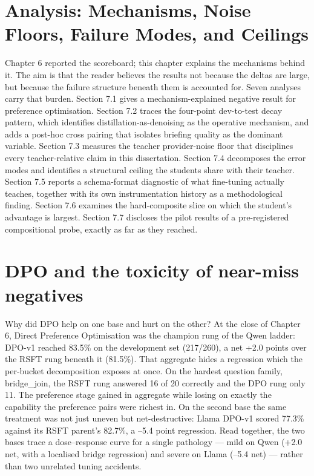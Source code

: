 \documentclass[10pt]{article} %
\begin{document}
\section{Analysis: Mechanisms, Noise Floors, Failure Modes, and Ceilings}\label{sec:chapter-7-analysis-mechanisms-noise-floo}

Chapter 6 reported the scoreboard; this chapter explains the mechanisms behind it. The aim is that the reader believes the results not because the deltas are large, but because the failure structure beneath them is accounted for. Seven analyses carry that burden. Section 7.1 gives a mechanism-explained negative result for preference optimisation. Section 7.2 traces the four-point dev-to-test decay pattern, which identifies distillation-as-denoising as the operative mechanism, and adds a post-hoc cross pairing that isolates briefing quality as the dominant variable. Section 7.3 measures the teacher provider-noise floor that disciplines every teacher-relative claim in this dissertation. Section 7.4 decomposes the error modes and identifies a structural ceiling the students share with their teacher. Section 7.5 reports a schema-format diagnostic of what fine-tuning actually teaches, together with its own instrumentation history as a methodological finding. Section 7.6 examines the hard-composite slice on which the student's advantage is largest. Section 7.7 discloses the pilot results of a pre-registered compositional probe, exactly as far as they reached.

\section{DPO and the toxicity of near-miss negatives}\label{sec:dpo-and-the-toxicity-of-near-miss-negati}

Why did DPO help on one base and hurt on the other? At the close of Chapter 6, Direct Preference Optimisation was the champion rung of the Qwen ladder: DPO-v1 reached 83.5\% on the development set (217/260), a net +2.0 points over the RSFT rung beneath it (81.5\%). That aggregate hides a regression which the per-bucket decomposition exposes at once. On the hardest question family, bridge\_join, the RSFT rung answered 16 of 20 correctly and the DPO rung only 11. The preference stage gained in aggregate while losing on exactly the capability the preference pairs were richest in. On the second base the same treatment was not just uneven but net-destructive: Llama DPO-v1 scored 77.3\% against its RSFT parent's 82.7\%, a --5.4 point regression. Read together, the two bases trace a dose--response curve for a single pathology --- mild on Qwen (+2.0 net, with a localised bridge regression) and severe on Llama (--5.4 net) --- rather than two unrelated tuning accidents.
\end{document}
